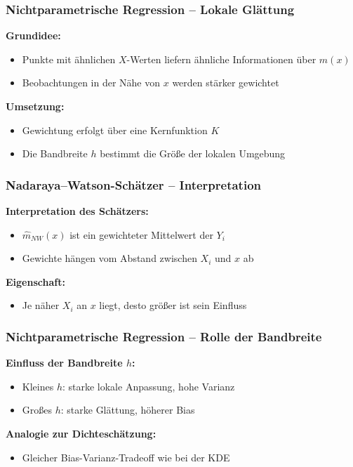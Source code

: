 \documentclass{beamer}
\begin{document}
	
	\begin{frame}
		\frametitle{Nichtparametrische Regression -- Lokale Glättung}
		
		\textbf{Grundidee:}
		\begin{itemize}
			\item Punkte mit ähnlichen $X$-Werten liefern ähnliche Informationen über $m(x)$
			\item Beobachtungen in der Nähe von $x$ werden stärker gewichtet
		\end{itemize}
		
		\vspace{0.5em}
		
		\textbf{Umsetzung:}
		\begin{itemize}
			\item Gewichtung erfolgt über eine Kernfunktion $K$
			\item Die Bandbreite $h$ bestimmt die Größe der lokalen Umgebung
		\end{itemize}
	\end{frame}
	
	
	\begin{frame}
		\frametitle{Nadaraya--Watson-Schätzer -- Interpretation}
		
		\textbf{Interpretation des Schätzers:}
		\begin{itemize}
			\item $\hat{m}_{NW}(x)$ ist ein gewichteter Mittelwert der $Y_i$
			\item Gewichte hängen vom Abstand zwischen $X_i$ und $x$ ab
		\end{itemize}
		
		\vspace{0.5em}
		
		\textbf{Eigenschaft:}
		\begin{itemize}
			\item Je näher $X_i$ an $x$ liegt, desto größer ist sein Einfluss
		\end{itemize}
	\end{frame}
	
	
	\begin{frame}
		\frametitle{Nichtparametrische Regression -- Rolle der Bandbreite}
		
		\textbf{Einfluss der Bandbreite $h$:}
		\begin{itemize}
			\item Kleines $h$: starke lokale Anpassung, hohe Varianz
			\item Großes $h$: starke Glättung, höherer Bias
		\end{itemize}
		
		\vspace{0.5em}
		
		\textbf{Analogie zur Dichteschätzung:}
		\begin{itemize}
			\item Gleicher Bias-Varianz-Tradeoff wie bei der KDE
		\end{itemize}
	\end{frame}
	
\end{document}
